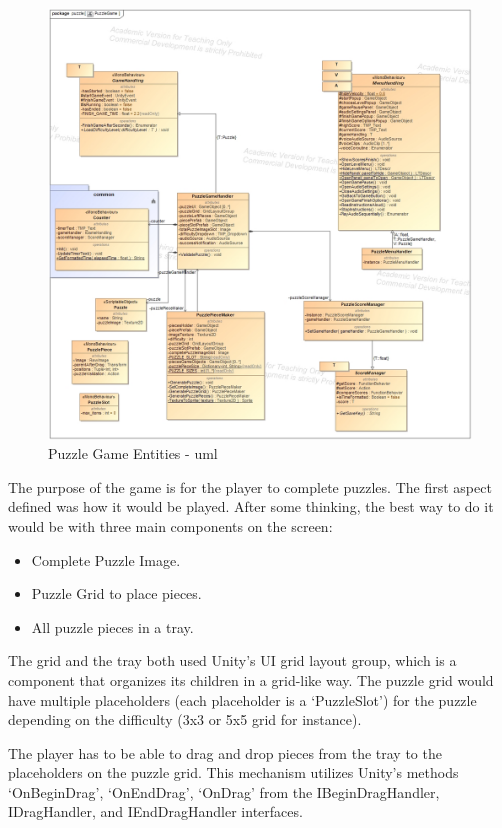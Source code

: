 \begin{figure}[!h]
    \centering
    \includegraphics[width=\linewidth]{Chapters/new_architechture/class__puzzle__PuzzleGame.jpg}
    \caption{Puzzle Game Entities - \gls{uml}}
    \label{fig:puzzleGameArq}
\end{figure}

The purpose of the game is for the player to complete puzzles. The first aspect defined was how it would be played. After some thinking, the best way to do it would be with three main components on the screen:

\begin{itemize}
    \item Complete Puzzle Image.
    \item Puzzle Grid to place pieces.
    \item All puzzle pieces in a tray.
\end{itemize}

The grid and the tray both used Unity's UI grid layout group, which is a component that organizes its children in a grid-like way. The puzzle grid would have multiple placeholders (each placeholder is a `PuzzleSlot') for the puzzle depending on the difficulty (3x3 or 5x5 grid for instance).

The player has to be able to drag and drop pieces from the tray to the placeholders on the puzzle grid. This mechanism utilizes Unity's methods `OnBeginDrag', `OnEndDrag', `OnDrag' from the IBeginDragHandler, IDragHandler, and IEndDragHandler interfaces.

